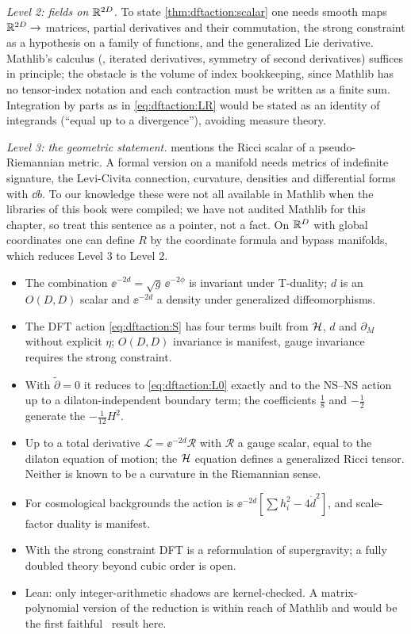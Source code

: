 \emph{Level 2: fields on $\mathbb{R}^{2D}$.} To state \cref{thm:dftaction:scalar} one needs smooth maps
$\mathbb{R}^{2D}\to$ matrices, partial derivatives and their commutation, the strong constraint as a
hypothesis on a family of functions, and the generalized Lie derivative. Mathlib's calculus
(, iterated derivatives, symmetry of second derivatives) suffices in principle; the
obstacle is the volume of index bookkeeping, since Mathlib has no tensor-index notation and each
contraction must be written as a finite sum. Integration by parts as in
\eqref{eq:dftaction:LR} would be stated as an identity of integrands (``equal up to a
divergence''), avoiding measure theory.

\emph{Level 3: the geometric statement.}  mentions the Ricci
scalar of a pseudo-Riemannian metric. A formal version on a manifold needs metrics of
indefinite signature, the Levi-Civita connection, curvature, densities and differential forms
with $\dd b$. To our knowledge these were not all available in Mathlib when the libraries of
this book were compiled; we have not audited Mathlib for this chapter, so treat this sentence
as a pointer, not a fact. On $\mathbb{R}^D$ with global coordinates one can define $R$ by the coordinate
formula and bypass manifolds, which reduces Level 3 to Level 2.

\begin{summarybox}
\begin{itemize}[leftmargin=*]
\item The combination $\ee^{-2d}=\sqrt g\,\ee^{-2\phi}$ is invariant under T-duality; $d$ is an
 $O(D,D)$ scalar and $\ee^{-2d}$ a density under generalized diffeomorphisms.
\item The DFT action \eqref{eq:dftaction:S} has four terms built from $\mathcal{H}$, $d$ and
 $\partial_M$ without explicit $\eta$; $O(D,D)$ invariance is manifest, gauge invariance requires
 the strong constraint.
\item With $\tilde\partial=0$ it reduces to \eqref{eq:dftaction:L0} exactly and to the NS--NS
 action up to a dilaton-independent boundary term; the coefficients $\tfrac18$ and $-\tfrac12$
 generate the $-\tfrac1{12}H^2$.
\item Up to a total derivative $\mathcal L=\ee^{-2d}\mathcal R$ with $\mathcal R$ a gauge scalar,
 equal to the dilaton equation of motion; the $\mathcal{H}$ equation defines a generalized Ricci tensor.
 Neither is known to be a curvature in the Riemannian sense.
\item For cosmological backgrounds the action is
 $\ee^{-2d}[\sum h_i^2-4\dot d^2]$, and scale-factor duality is manifest.
\item With the strong constraint DFT is a reformulation of supergravity; a fully doubled theory
 beyond cubic order is open.
\item Lean: only integer-arithmetic shadows are kernel-checked. A matrix-polynomial version of
 the reduction is within reach of Mathlib and would be the first faithful \TA\ result here.
\end{itemize}
\end{summarybox}

